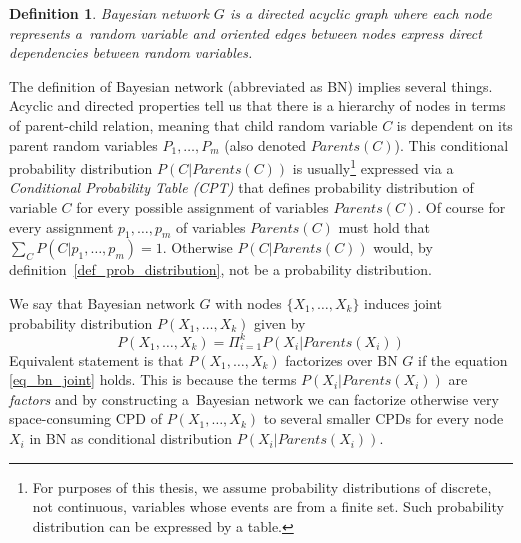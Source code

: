 \documentclass[english,cover]{fitthesis} %
\newtheorem{math_def}{Definition}[chapter] %
\newcommand{\term}[1]{\emph{#1}}           %
\begin{document}
\begin{math_def}\label{def_bayesian_network}
    Bayesian network $G$ is a directed acyclic graph where each node represents a~random variable and oriented edges between nodes express direct dependencies between random variables.
\end{math_def}

The definition of Bayesian network (abbreviated as BN) implies several things. Acyclic and directed properties tell us that there is a hierarchy of nodes in terms of parent-child relation, meaning that child random variable $C$ is dependent on its parent random variables $P_1, \dots, P_m$ (also denoted $Parents(C)$). This conditional probability distribution $P(C | Parents(C))$ is usually\footnote{For purposes of this thesis, we assume probability distributions of discrete, not continuous, variables whose events are from a finite set. Such probability distribution can be expressed by a table.} expressed via a \term{Conditional Probability Table (CPT)} that defines probability distribution of variable $C$ for every possible assignment of variables $Parents(C)$. Of course for every assignment $p_1,\dots,p_m$ of variables $Parents(C)$ must hold that $\sum_C P(C | p_1, \dots, p_m) = 1$. Otherwise $P(C | Parents(C))$ would, by definition~\ref{def_prob_distribution}, not be a probability distribution.

We say that Bayesian network $G$ with nodes $\lbrace X_1, \dots, X_k\rbrace$ induces joint probability distribution $P(X_1, \dots, X_k)$ given by
\begin{equation}\label{eq_bn_joint}
    P(X_1, \dots, X_k) = \Pi_{i=1}^k P(X_i | Parents(X_i))
\end{equation}
Equivalent statement is that $P(X_1, \dots, X_k)$ factorizes over BN $G$ if the equation \eqref{eq_bn_joint} holds. This is because the terms $P(X_i | Parents(X_i))$ are \term{factors} and by constructing a~Bayesian network we can factorize otherwise very space-consuming CPD of $P(X_1, \dots, X_k)$ to several smaller CPDs for every node $X_i$ in BN as conditional distribution $P(X_i | Parents(X_i))$.
\end{document}
